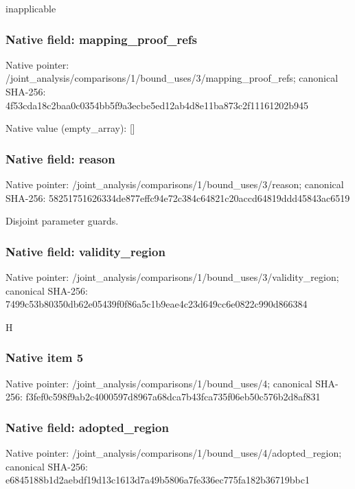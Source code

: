 \documentclass[10pt,a4paper]{article}
\begin{document}
\begingroup\raggedright\sloppy inapplicable\par\endgroup

\subsubsection{Native field: mapping\_\allowbreak{}proof\_\allowbreak{}refs}
Native pointer: /joint\_\allowbreak{}analysis/comparisons/1/bound\_\allowbreak{}uses/3/mapping\_\allowbreak{}proof\_\allowbreak{}refs; canonical SHA-256: 4f53cda18c2baa0c0354bb5f9a3ecbe5ed12ab4d8e11ba873c2f11161202b945

Native value (empty\_\allowbreak{}array): []

\subsubsection{Native field: reason}
Native pointer: /joint\_\allowbreak{}analysis/comparisons/1/bound\_\allowbreak{}uses/3/reason; canonical SHA-256: 58251751626334de877effc94e72c384c64821c20accd64819ddd45843ac6519

\begingroup\raggedright\sloppy Disjoint parameter guards.\par\endgroup

\subsubsection{Native field: validity\_\allowbreak{}region}
Native pointer: /joint\_\allowbreak{}analysis/comparisons/1/bound\_\allowbreak{}uses/3/validity\_\allowbreak{}region; canonical SHA-256: 7499c53b80350db62e05439f0f86a5c1b9eae4c23d649cc6e0822c990d866384

\begingroup\raggedright\sloppy H\par\endgroup

\subsubsection{Native item 5}
Native pointer: /joint\_\allowbreak{}analysis/comparisons/1/bound\_\allowbreak{}uses/4; canonical SHA-256: f3fef0c598f9ab2c4000597d8967a68dca7b43fca735f06eb50c576b2d8af831

\subsubsection{Native field: adopted\_\allowbreak{}region}
Native pointer: /joint\_\allowbreak{}analysis/comparisons/1/bound\_\allowbreak{}uses/4/adopted\_\allowbreak{}region; canonical SHA-256: e6845188b1d2aebdf19d13c1613d7a49b5806a7fe336ec775fa182b36719bbc1
\end{document}
